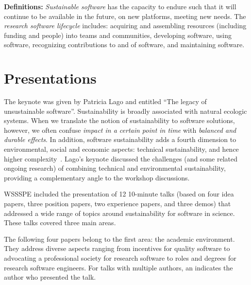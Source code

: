 \documentclass[11pt, oneside]{amsart}
\newcommand{\note}[1]{ {\textcolor{blueish}    { ***Note:      #1 }}}
\begin{document}
\textbf{Definitions:}
\emph{Sustainable software} has the capacity to endure such that it will continue to
be available in the future, on new platforms, meeting new needs.
The \emph{research software lifecycle} includes:
acquiring and assembling resources (including funding and people) into teams and communities,
developing software,
using software,
recognizing contributions to and of software,
and
maintaining software.


\section{Presentations}\label{sec:presentations}


The keynote was given by Patricia Lago and entitled ``The legacy of unsustainable software''.
%
Sustainability is broadly associated with natural ecologic systems. When we translate the notion of sustainability to software solutions, however, we often confuse {\em impact in a certain point in time} with {\em balanced and durable effects}. In addition, software sustainability adds a fourth dimension to environmental, social and economic aspects: technical sustainability, and hence higher complexity~\cite{Lago2015}.  Lago's keynote discussed the challenges (and some related ongoing research) of combining technical and environmental sustainability, providing a complementary angle to the workshop discussions.



WSSSPE included the presentation of 12 10-minute talks (based on four idea papers, three position papers,
two experience papers, and three demos) that addressed a wide range of topics around
sustainability for software in science. These talks covered three main areas.

The following four papers belong to the first area: the academic environment.
They address diverse aspects ranging from incentives for quality software to
advocating a professional society for research software to roles and degrees for
research software engineers. For talks with multiple authors, an
\textsuperscript{\textasteriskcentered} indicates the author who presented the talk.
\end{document}
